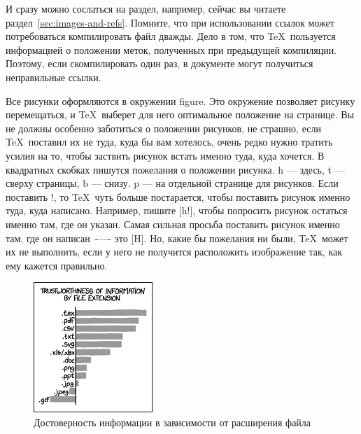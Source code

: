 \documentclass[russian]{lecture-notes}
\begin{document}
И сразу можно сослаться на раздел, например, сейчас вы читаете раздел~\ref{sec:images-and-refs}.
Помните, что при использовании ссылок может потребоваться компилировать файл дважды.
Дело в том, что \TeX\ пользуется информацией о положении меток, полученных при предыдущей компиляции.
Поэтому, если скомпилировать один раз, в документе могут получиться неправильные ссылки.

Все рисунки оформляются в окружении figure. Это окружение позволяет рисунку перемещаться,
и \TeX\ выберет для него оптимальное положение на странице. Вы не должны особенно заботиться о положении
рисунков, не страшно, если \TeX\ поставил их не туда, куда бы вам хотелось, очень редко нужно тратить
усилия на то, чтобы заствить рисунок встать именно туда, куда хочется.
В квадратных скобках пишутся пожелания о положении рисунка. h — здесь, t — сверху страницы, b — снизу. p — на
отдельной странице для рисунков. Если поставить !, то \TeX\ чуть больше постарается, чтобы поставить рисунок
именно туда, куда написано. Например, пишите [h!], чтобы попросить рисунок остаться именно там, где
он указан. Самая сильная просьба поставить рисунок именно там, где он написан~-—- это [H].
Но, какие бы пожелания ни были, \TeX\ может их не выполнить, если у него не получится расположить
изображение так, как ему кажется правильно.

\begin{figure}[htb]
    \centering %
    \includegraphics[width=0.4\textwidth]{xkcd1301.png}
    \caption{Достоверность информации в зависимости от расширения файла}
    \label{fig:example1}
\end{figure}
\end{document}
